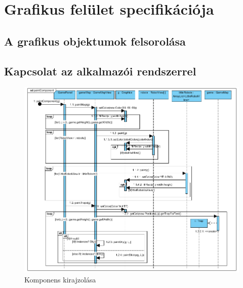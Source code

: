 %
\chapter{Grafikus felület specifikációja}

\thispagestyle{fancy}




\section{A grafikus objektumok felsorolása}


\newpage

\section{Kapcsolat az alkalmazói rendszerrel}

\begin{figure}[h]
	\begin{center}
		\includegraphics[width=18cm]{chapters/chapter11/paintcomponent.png}
		\caption{Komponens kirajzolása}
		\label{fig:Grafika}
	\end{center}
\end{figure}

\clearpage

